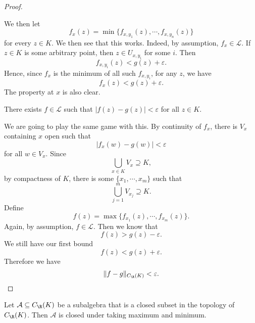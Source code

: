 \documentclass[a4paper]{article}
\begin{document}
\begin{proof}
\begin{center}
  \end{center}
  We then let
  \[
    f_x(z) = \min\{f_{x, y_1}(z), \cdots, f_{x, y_n}(z)\}
  \]
  for every $z \in K$. We then see that this works. Indeed, by assumption, $f_x \in \mathcal{L}$. If $z \in K$ is some arbitrary point, then $z \in U_{x, y_i}$ for some $i$. Then
  \[
    f_{x, y_i}(z) < g(z) + \varepsilon.
  \]
  Hence, since $f_x$ is the minimum of all such $f_{x, y_i}$, for any $z$, we have
  \[
    f_x(z) < g(z) + \varepsilon.
  \]
  The property at $x$ is also clear.
  \begin{claim}
    There exists $f \in \mathcal{L}$ such that $|f(z) - g(z)| < \varepsilon$ for all $z \in K$.
  \end{claim}
  We are going to play the same game with this. By continuity of $f_x$, there is $V_x$ containing $x$ open such that
  \[
    |f_x(w) - g(w)| < \varepsilon
  \]
  for all $w \in V_x$. Since
  \[
    \bigcup_{x\in K} V_x \supseteq K,
  \]
  by compactness of $K$, there is some $\{x_1, \cdots, x_m\}$ such that
  \[
    \bigcup_{j = 1}^m V_{x_j} \supseteq K.
  \]
  Define
  \[
    f(z) = \max\{f_{x_1}(z), \cdots, f_{x_m}(z)\}.
  \]
  Again, by assumption, $f \in \mathcal{L}$. Then we know that
  \[
    f(z) > g(z) - \varepsilon.
  \]
  We still have our first bound
  \[
    f(z) < g(z) + \varepsilon.
  \]
  Therefore we have
  \[
    \|f - g\|_{C_\R (K)} < \varepsilon.
  \]
\end{proof}

\begin{lemma}
  Let $\mathcal{A}\subseteq C_\R(K)$ be a subalgebra that is a closed subset in the topology of $C_\R(K)$. Then $\mathcal{A}$ is closed under taking maximum and minimum.
\end{lemma}
\end{document}
